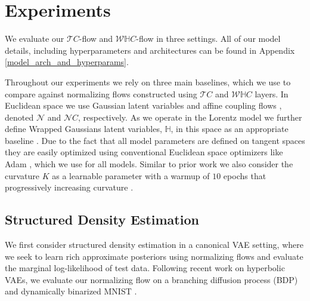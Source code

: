 \section{Experiments}
We evaluate our $\mathcal{T}C$-flow and $\mathcal{W}\mathbb{H}C$-flow in three settings. All of our model details, including hyperparameters and architectures can be found in Appendix \ref{model_arch_and_hyperparams}.

Throughout our experiments we rely on three main baselines, which we use to compare against normalizing flows constructed using $\mathcal{T}C$ and $\mathcal{W}\mathbb{H}C$ layers. In Euclidean space we use Gaussian latent variables and affine coupling flows \cite{dinh2016density}, denoted $\mathcal{N}$ and $\mathcal{N}C$, respectively. As we operate in the Lorentz model we further define Wrapped Gaussians latent variables, $\mathbb{H}$, in this space as an appropriate baseline \cite{nagano2019wrapped}. Due to the fact that all model parameters are defined on tangent spaces they are easily optimized using conventional Euclidean space optimizers like Adam \cite{kingma2014adam}, which we use for all models. Similar to prior work we also consider the curvature $K$ as a learnable parameter with a warmup of $10$ epochs that progressively increasing curvature \cite{skopek2019mixed}.


\subsection{Structured Density Estimation}
We first consider structured density estimation in a canonical VAE setting, where we seek to learn rich approximate posteriors using normalizing flows and evaluate the marginal log-likelihood of test data. Following recent work on hyperbolic VAEs, we evaluate our normalizing flow on a branching diffusion process (BDP) \cite{mathieu2019continuous} and dynamically binarized MNIST \cite{skopek2019mixed}. 

